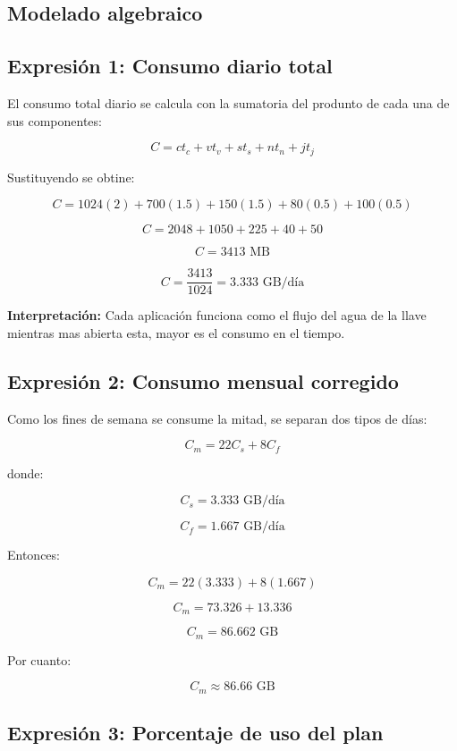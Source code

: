 \documentclass[12pt,a4paper]{article}
\begin{document}
\begin{center}
		\section{Modelado algebraico}
		
		\subsection{Expresión 1: Consumo diario total}
		
		El consumo total diario se calcula con la sumatoria del produnto de cada una de sus componentes:
		
		\[
		C=ct_c+vt_v+st_s+nt_n+jt_j
		\]
		
		Sustituyendo se obtine:
		
		\[
		C=1024(2)+700(1.5)+150(1.5)+80(0.5)+100(0.5)
		\]
		
		\[
		C=2048+1050+225+40+50
		\]
		
		\[
		C=3413\text{ MB}
		\]
		
		\[
		C=\frac{3413}{1024}=3.333\text{ GB/día}
		\]
		
		\textbf{Interpretación:} Cada aplicación funciona como el flujo del agua de la llave mientras mas abierta esta, mayor es el consumo en el tiempo.
		
		\subsection{Expresión 2: Consumo mensual corregido}
		
		Como los fines de semana se consume la mitad, se separan dos tipos de días:
		
		\[
		C_m=22C_s+8C_f
		\]
		
		donde:
		
		\[
		C_s=3.333\text{ GB/día}
		\]
		
		\[
		C_f=1.667\text{ GB/día}
		\]
		
		Entonces:
		
		\[
		C_m=22(3.333)+8(1.667)
		\]
		
		\[
		C_m=73.326+13.336
		\]
		
		\[
		C_m=86.662\text{ GB}
		\]
		
		Por cuanto:
		
		\[
		\boxed{C_m\approx 86.66\text{ GB}}
		\]
		
		\subsection{Expresión 3: Porcentaje de uso del plan}
		

\end{center}
\end{document}
